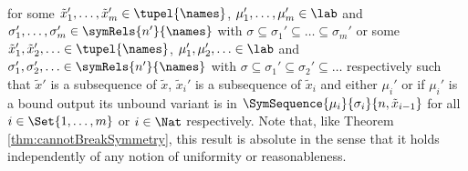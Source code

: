 \documentclass[11pt,techReport]{eptcs}
\begin{document}
{\begin{align*}
	\end{align*}
	for some $ \tilde{x}_1', \ldots, \tilde{x}_m' \in \tupel{\names} $, $ \mu_1', \ldots, \mu_m' \in \lab $ and $ \sigma_1', \ldots, \sigma_m' \in \symRels{n'}{\names} $ with $ \sigma \subseteq \sigma_1' \subseteq \ldots \subseteq \sigma_m' $ or some $ \tilde{x}_1', \tilde{x}_2', \ldots \in \tupel{\names} $, $ \mu_1', \mu_2', \ldots \in \lab $ and $ \sigma_1', \sigma_2', \ldots \in \symRels{n'}{\names} $ with $ \sigma \subseteq \sigma_1' \subseteq \sigma_2' \subseteq \ldots $ respectively such that $ \tilde{x}' $ is a subsequence of $ \tilde{x} $, $ \tilde{x}_i' $ is a subsequence of $ \tilde{x}_i $ and either $ \mu_i' $ or if $ \mu_i' $ is a bound output its unbound variant is in $ \SymSequence{\mu_i}{\sigma_i}{n, \tilde{x}_{i{-}1}} $ for all $ i \in \Set{ 1, \ldots, m } $ or $ i \in \Nat $ respectively.
}
\noindent 
Note that, like Theorem \ref{thm:cannotBreakSymmetry}, this result is absolute in the sense that it holds independently of any notion of uniformity or reasonableness. 
\end{document}
